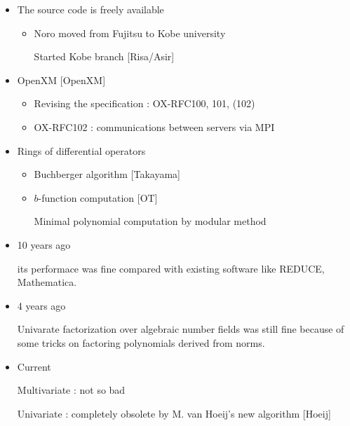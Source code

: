 \begin{slide}{}
\begin{itemize}
\item The source code is freely available

\begin{itemize}
\item Noro moved from Fujitsu to Kobe university

Started Kobe branch [Risa/Asir]
\end{itemize}

\item OpenXM [OpenXM]

\begin{itemize}
\item Revising the specification : OX-RFC100, 101, (102)

\item OX-RFC102 : communications between servers via MPI
\end{itemize}

\item Rings of differential operators

\begin{itemize}
\item Buchberger algorithm [Takayama]

\item $b$-function computation [OT]

Minimal polynomial computation by modular method
\end{itemize}
\end{itemize}

\end{slide}

\begin{slide}{}

\begin{itemize}
\item 10 years ago

its performace was fine compared with existing software
like REDUCE, Mathematica.

\item 4 years ago

Univarate factorization over algebraic number fields was
still fine because of some tricks on factoring polynomials
derived from norms.

\item Current

Multivariate : not so bad

Univariate : completely obsolete by M. van Hoeij's new algorithm
[Hoeij]
\end{itemize}

\end{slide}

